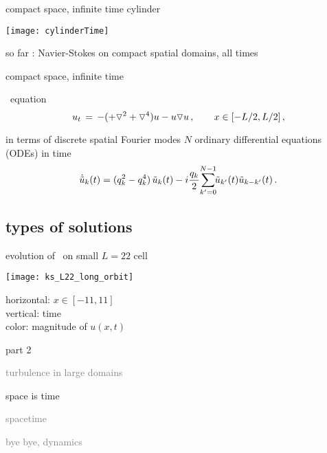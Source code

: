 \begin{frame}{compact space, infinite time cylinder}
\begin{center}
\texttt{[image: cylinderTime]}
\end{center}
so far : Navier-Stokes on compact spatial domains, all times
\end{frame}

\begin{frame}{compact space, infinite time} %
\begin{block}{\KS\ equation}
\[
  u_t \,=\,
    -({\color{red}+}\triangledown^2 +{\color{red}\triangledown^4}) u
    - u \triangledown u
    \,,\qquad   x \in [-L/2,L/2]
    \,,
\]
\end{block}

\bigskip

\begin{block}{in terms of discrete spatial Fourier modes}
$N$ ordinary differential equations (ODEs) in time
\[
\dot{\Fu}_k(\zeit) = ( q_k^2 - q_k^4 )\, \Fu_k(\zeit)
- i \frac{q_k}{2} \!\sum_{k'=0}^{N-1} \!\!\Fu_{k'}(\zeit) \Fu_{k-k'}(\zeit)
\,.
\]
\end{block}
\end{frame}


\subsection{types of solutions}
\begin{frame}{evolution of \KS\ on small $L=22$ cell}
\begin{center}
  \texttt{[image: ks\_L22\_long\_orbit]}
\end{center}
horizontal: $x \in [-11,11]$
\\
vertical: time
\\
color: magnitude of $u(x,t)$
\end{frame}

\begin{frame}{part 2}
\begin{enumerate}
              \item
    \textcolor{gray}{\small
turbulence in large domains
        }
              \item
    {\Large
space is time
    }\textcolor{gray}{\small
              \item
spacetime
              \item
bye bye, dynamics
                    }
            \end{enumerate}
\end{frame}


